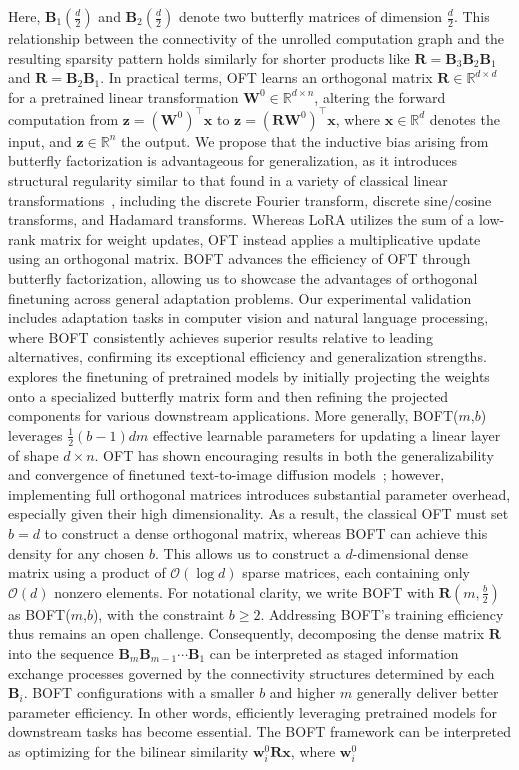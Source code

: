 Here, $\bm{B}_1(\frac{d}{2})$ and $\bm{B}_2(\frac{d}{2})$ denote two butterfly matrices of dimension $\frac{d}{2}$. This relationship between the connectivity of the unrolled computation graph and the resulting sparsity pattern holds similarly for shorter products like $\bm{R}=\bm{B}_3\bm{B}_2\bm{B}_1$ and $\bm{R}=\bm{B}_2\bm{B}_1$. In practical terms, OFT learns an orthogonal matrix $\bm{R}\in\mathbb{R}^{d\times d}$ for a pretrained linear transformation $\bm{W}^0\in\mathbb{R}^{d\times n}$, altering the forward computation from $\bm{z}=(\bm{W}^0)^\top\bm{x}$ to $\bm{z}=(\bm{R}\bm{W}^0)^\top\bm{x}$, where $\bm{x}\in\mathbb{R}^{d}$ denotes the input, and $\bm{z}\in\mathbb{R}^{n}$ the output. We propose that the inductive bias arising from butterfly factorization is advantageous for generalization, as it introduces structural regularity similar to that found in a variety of classical linear transformations~\cite{dao2019kaleidoscope}, including the discrete Fourier transform, discrete sine/cosine transforms, and Hadamard transforms. Whereas LoRA utilizes the sum of a low-rank matrix for weight updates, OFT instead applies a multiplicative update using an orthogonal matrix. BOFT advances the efficiency of OFT through butterfly factorization, allowing us to showcase the advantages of orthogonal finetuning across general adaptation problems. Our experimental validation includes adaptation tasks in computer vision and natural language processing, where BOFT consistently achieves superior results relative to leading alternatives, confirming its exceptional efficiency and generalization strengths. \cite{dao2022monarch} explores the finetuning of pretrained models by initially projecting the weights onto a specialized butterfly matrix form and then refining the projected components for various downstream applications. More generally, BOFT($m$,$b$) leverages $\frac{1}{2}(b-1)dm$ effective learnable parameters for updating a linear layer of shape $d\times n$. OFT has shown encouraging results in both the generalizability and convergence of finetuned text-to-image diffusion models~\cite{qiu2023controlling}; however, implementing full orthogonal matrices introduces substantial parameter overhead, especially given their high dimensionality. As a result, the classical OFT must set $b=d$ to construct a dense orthogonal matrix, whereas BOFT can achieve this density for any chosen $b$. This allows us to construct a $d$-dimensional dense matrix using a product of $\mathcal{O}(\log d)$ sparse matrices, each containing only $\mathcal{O}(d)$ nonzero elements. For notational clarity, we write BOFT with $\bm{R}(m,\frac{b}{2})$ as BOFT($m$,$b$), with the constraint $b\geq 2$. Addressing BOFT's training efficiency thus remains an open challenge. Consequently, decomposing the dense matrix $\bm{R}$ into the sequence $\bm{B}_m\bm{B}_{m-1}\cdots\bm{B}_1$ can be interpreted as staged information exchange processes governed by the connectivity structures determined by each $\bm{B}_i$. BOFT configurations with a smaller $b$ and higher $m$ generally deliver better parameter efficiency. In other words, efficiently leveraging pretrained models for downstream tasks has become essential. The BOFT framework can be interpreted as optimizing for the bilinear similarity $\bm{w}^0_i\bm{R}\bm{x}$, where $\bm{w}^0_i$ 